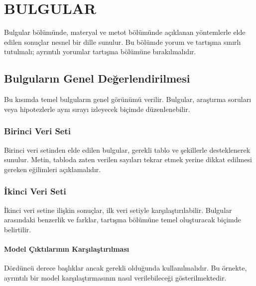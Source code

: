 \documentclass[12pt,a4paper]{report}
\begin{document}
\chapter{BULGULAR}\label{ch:ifnecch4}

Bulgular b\"{o}l\"{u}m\"{u}nde, materyal ve metot b\"{o}l\"{u}m\"{u}nde a\c{c}\i{}klanan y\"{o}ntemlerle elde edilen sonu\c{c}lar nesnel bir dille sunulur. Bu b\"{o}l\"{u}mde yorum ve tart\i{}\c{s}ma s\i{}n\i{}rl\i{} tutulmal\i{}; ayr\i{}nt\i{}l\i{} yorumlar tart\i{}\c{s}ma b\"{o}l\"{u}m\"{u}ne b\i{}rak\i{}lmal\i{}d\i{}r.

\section{Bulgular\i{}n Genel De\u{g}erlendirilmesi}

Bu k\i{}s\i{}mda temel bulgular\i{}n genel g\"{o}r\"{u}n\"{u}m\"{u} verilir. Bulgular, ara\c{s}t\i{}rma sorular\i{} veya hipotezlerle ayn\i{} s\i{}ray\i{} izleyecek bi\c{c}imde d\"{u}zenlenebilir.

\subsection{Birinci Veri Seti}

Birinci veri setinden elde edilen bulgular, gerekli tablo ve \c{s}ekillerle desteklenerek sunulur. Metin, tabloda zaten verilen say\i{}lar\i{} tekrar etmek yerine dikkat edilmesi gereken e\u{g}ilimleri a\c{c}\i{}klamal\i{}d\i{}r.

\subsection{\.{I}kinci Veri Seti}

\.{I}kinci veri setine ili\c{s}kin sonu\c{c}lar, ilk veri setiyle kar\c{s}\i{}la\c{s}t\i{}r\i{}labilir. Bulgular aras\i{}ndaki benzerlik ve farklar, tart\i{}\c{s}ma b\"{o}l\"{u}m\"{u}ne temel olu\c{s}turacak bi\c{c}imde belirtilir.

\subsubsection{Model \c{C}\i{}kt\i{}lar\i{}n\i{}n Kar\c{s}\i{}la\c{s}t\i{}r\i{}lmas\i{}}

D\"{o}rd\"{u}nc\"{u} derece ba\c{s}l\i{}klar ancak gerekli oldu\u{g}unda kullan\i{}lmal\i{}d\i{}r. Bu \"{o}rnekte, ayr\i{}nt\i{}l\i{} bir model kar\c{s}\i{}la\c{s}t\i{}rmas\i{}n\i{}n nas\i{}l verilebilece\u{g}i g\"{o}sterilmektedir.
\end{document}
